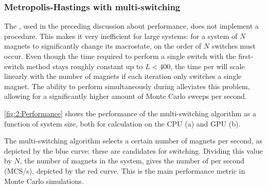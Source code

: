 \subsubsection{Metropolis-Hastings with multi-switching}
The , used in the preceding discussion about performance, does not implement a  procedure.
This makes it very inefficient for large systems: for a system of $N$ magnets to significantly change its macrostate, on the order of $N$ switches must occur.
Even though the time required to perform a single switch with the first-switch method stays roughly constant up to $L<400$, the time per  will scale linearly with the number of magnets if each iteration only switches a single magnet.
The ability to perform  simultaneously during  alleviates this problem, allowing for a significantly higher amount of Monte Carlo sweeps per second. \par
\cref{fig:2:Performance} shows the performance of the multi-switching algorithm as a function of system size, both for calculation on the CPU (a) and GPU (b).

\vspace{-1em}
\vspace{-1em}

The multi-switching algorithm selects a certain number of magnets per second, as depicted by the blue curve: these are candidates for switching.
Dividing this value by $N$, the number of magnets in the system, gives the number of  per second (MCS/s), depicted by the red curve.
This is the main performance metric in Monte Carlo simulations. %

